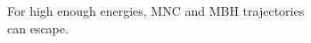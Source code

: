 \documentclass[preview]{standalone}
\begin{document}
For high enough energies, MNC and MBH trajectories\\ can escape.\\
\end{document}
